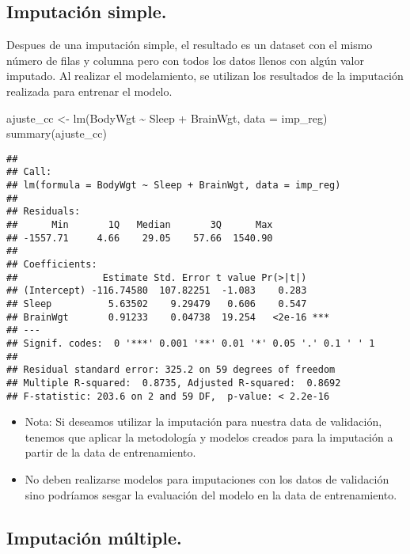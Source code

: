 \documentclass[
]{article}
\newenvironment{Shaded}{\begin{snugshade}}{\end{snugshade}}
\newcommand{\AttributeTok}[1]{\textcolor[rgb]{0.77,0.63,0.00}{#1}}
\newcommand{\FunctionTok}[1]{\textcolor[rgb]{0.00,0.00,0.00}{#1}}
\newcommand{\NormalTok}[1]{#1}
\newcommand{\OtherTok}[1]{\textcolor[rgb]{0.56,0.35,0.01}{#1}}
\newcommand{\SpecialCharTok}[1]{\textcolor[rgb]{0.00,0.00,0.00}{#1}}
\begin{document}
\hypertarget{imputaciuxf3n-simple.}{%
\subsection{Imputación simple.}\label{imputaciuxf3n-simple.}}

Despues de una imputación simple, el resultado es un dataset con el
mismo número de filas y columna pero con todos los datos llenos con
algún valor imputado. Al realizar el modelamiento, se utilizan los
resultados de la imputación realizada para entrenar el modelo.

\begin{Shaded}
\begin{Highlighting}[]
\NormalTok{ajuste\_cc }\OtherTok{\textless{}{-}} \FunctionTok{lm}\NormalTok{(BodyWgt }\SpecialCharTok{\textasciitilde{}}\NormalTok{ Sleep }\SpecialCharTok{+}\NormalTok{ BrainWgt, }\AttributeTok{data =}\NormalTok{ imp\_reg)}
\FunctionTok{summary}\NormalTok{(ajuste\_cc)}
\end{Highlighting}
\end{Shaded}

\begin{verbatim}
## 
## Call:
## lm(formula = BodyWgt ~ Sleep + BrainWgt, data = imp_reg)
## 
## Residuals:
##      Min       1Q   Median       3Q      Max 
## -1557.71     4.66    29.05    57.66  1540.90 
## 
## Coefficients:
##               Estimate Std. Error t value Pr(>|t|)    
## (Intercept) -116.74580  107.82251  -1.083    0.283    
## Sleep          5.63502    9.29479   0.606    0.547    
## BrainWgt       0.91233    0.04738  19.254   <2e-16 ***
## ---
## Signif. codes:  0 '***' 0.001 '**' 0.01 '*' 0.05 '.' 0.1 ' ' 1
## 
## Residual standard error: 325.2 on 59 degrees of freedom
## Multiple R-squared:  0.8735, Adjusted R-squared:  0.8692 
## F-statistic: 203.6 on 2 and 59 DF,  p-value: < 2.2e-16
\end{verbatim}

\begin{itemize}
\item
  Nota: Si deseamos utilizar la imputación para nuestra data de
  validación, tenemos que aplicar la metodología y modelos creados para
  la imputación a partir de la data de entrenamiento.
\item
  No deben realizarse modelos para imputaciones con los datos de
  validación sino podríamos sesgar la evaluación del modelo en la data
  de entrenamiento.
\end{itemize}

\hypertarget{imputaciuxf3n-muxfaltiple.}{%
\subsection{Imputación múltiple.}\label{imputaciuxf3n-muxfaltiple.}}
\end{document}
